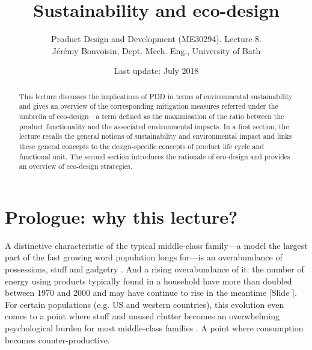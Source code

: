 \documentclass{article}
\newcounter{slide}
\newcommand{\subtitle}[1]{%
  \posttitle{%
    \par\end{center}
    \begin{center}\large#1\end{center}
    \vskip0.5em}%
}
\begin{document}
\title{Sustainability and eco-design}

\author{Product Design and Development (ME30294). Lecture 8. \\ Jérémy Bonvoisin, Dept. Mech. Eng., University of Bath}
\date{Last update: July 2018}

\maketitle

\begin{abstract}
This lecture discusses the implications of PDD in terms of environmental sustainability and gives an overview of the corresponding mitigation measures referred under the umbrella of eco-design---a term defined as the maximisation of the ratio between the product functionality and the associated environmental impacts. In a first section, the lecture recalls the general notions of sustainability and environmental impact and links these general concepts to the design-specific concepts of product life cycle and functional unit. The second section introduces the rationale of eco-design and provides an overview of eco-design strategies. 
\end{abstract}

\tableofcontents

\section{Prologue: why this lecture?}
\label{sec:prologue}
A distinctive characteristic of the typical middle-class family---a model the largest part of the fast growing word population longs for---is an overabundance of possessions, stuff and gadgetry \cite{menzelMaterialWorldGlobal1995}. And a rising overabundance of it: the number of energy using products typically found in a household have more than doubled between 1970 and 2000 \cite{owenRiseMachinesReview2006} and may have continue to rise in the meantime {\color{blue}[Slide ]}. For certain populations (e.g. US and western countries), this evolution even comes to a point where stuff and unused clutter becomes an overwhelming psychological burden for most middle-class families \cite{arnoldChangingAmericanHome2007}. A point where consumption becomes counter-productive.
\end{document}
